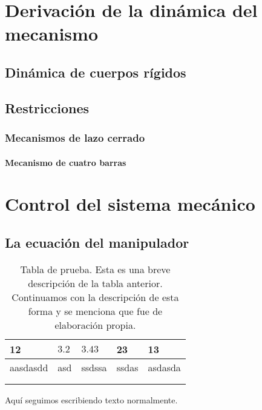 \chapter{Derivación de la dinámica del mecanismo}

\section{Dinámica de cuerpos rígidos}

\section{Restricciones}
\subsection{Mecanismos de lazo cerrado}
\subsubsection{Mecanismo de cuatro barras}

\chapter{Control del sistema mecánico}

\section{La ecuación del manipulador}

\begin{table}[h]
    \begin{tabular}{|l|l|l|l|l|}
        \hline
        12       & $3.2$ & $3.43$ & 23    & 13      \\ \hline
        aasdasdd & asd   & ssdssa & ssdas & asdasda \\ \hline
                 &       &        &       &         \\ \hline
                 &       &        &       &         \\ \hline
    \end{tabular}
    \caption[Tabla de prueba]{Tabla de prueba. Esta es una breve descripción de la tabla anterior. Continuamos con la descripción de esta forma y se menciona que fue de elaboración propia.}
    \label{cuadro:tablaprueba}
\end{table}

Aquí seguimos escribiendo texto normalmente.